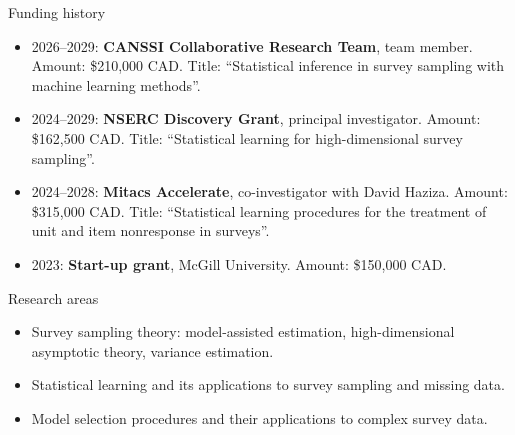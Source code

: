 \documentclass{resume}
\begin{document}
\begin{rSection}{Funding history}
\vspace{2mm}
\begin{itemize}
  \item[--] 2026--2029: \textbf{CANSSI Collaborative Research Team}, team member. Amount: \$210,000 CAD. Title: ``Statistical inference in survey sampling with machine learning methods''.
  \item[--] 2024--2029: \textbf{NSERC Discovery Grant}, principal investigator. Amount: \$162,500 CAD. Title: ``Statistical learning for high-dimensional survey sampling''.
  \item[--] 2024--2028: \textbf{Mitacs Accelerate}, co-investigator with David Haziza. Amount: \$315,000 CAD. Title: ``Statistical learning procedures for the treatment of unit and item nonresponse in surveys''.
  \item[--] 2023: \textbf{Start-up grant}, McGill University. Amount: \$150,000 CAD.
\end{itemize}
\end{rSection}

\begin{rSection}{Research areas}
\vspace{2mm}
\begin{itemize}
  \item[--] Survey sampling theory: model-assisted estimation, high-dimensional asymptotic theory, variance estimation.
  \item[--] Statistical learning and its applications to survey sampling and missing data.
  \item[--] Model selection procedures and their applications to complex survey data.
\end{itemize}
\end{rSection}
\end{document}
